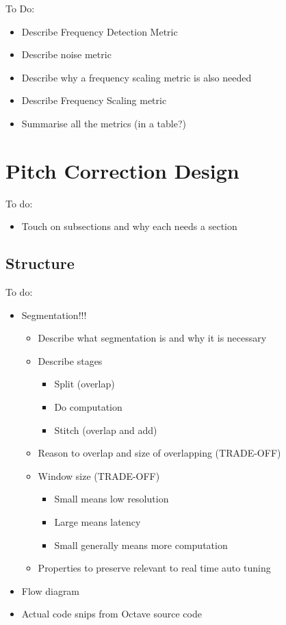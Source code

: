 \color{red}
To Do:
\begin{itemize}
	\item Describe Frequency Detection Metric
	\item Describe noise metric
	\item Describe why a frequency scaling metric is also needed
	\item Describe Frequency Scaling metric
	\item Summarise all the metrics (in a table?)
\end{itemize}
\color{black}

\section{Pitch Correction Design}

\color{red}
To do:
\begin{itemize}
	\item Touch on subsections and why each needs a section
\end{itemize}
\color{black}

\subsection{Structure}

\color{red}
To do:
\begin{itemize}
	\item Segmentation!!!
	\begin{itemize}
		\item Describe what segmentation is and why it is necessary
		\item Describe stages
		\begin{itemize}
			\item Split (overlap)
			\item Do computation
			\item Stitch (overlap and add)
		\end{itemize}
		\item Reason to overlap and size of overlapping (TRADE-OFF)
		\item Window size (TRADE-OFF)
		\begin{itemize}
			\item Small means low resolution
			\item Large means latency
			\item Small generally means more computation
		\end{itemize}
		\item Properties to preserve relevant to real time auto tuning
	\end{itemize}
	\item Flow diagram
	\item Actual code snips from Octave source code
\end{itemize}
\color{black}

